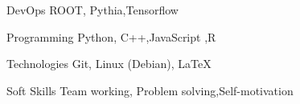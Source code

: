 

\begin{cvskills}

  \cvskill
    {DevOps} %
    {ROOT, Pythia,Tensorflow} %


  \cvskill
    {Programming} %
    { Python, C++,JavaScript ,R} %

  \cvskill
    {Technologies} %
    { Git,  Linux (Debian), \LaTeX} %

      \cvskill
    {Soft Skills} %
    {Team working, Problem solving,Self-motivation} %


\end{cvskills}
